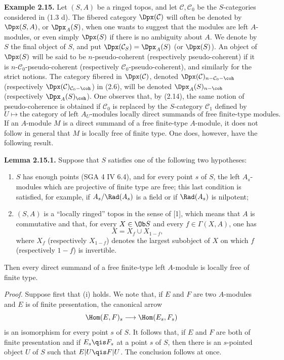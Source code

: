 \documentclass[11pt]{article}
\begin{document}
\textbf{Example 2.15.} Let \((S,A)\) be a ringed topos, and let \(\mathcal C,\mathcal C_0\) be the \(S\)-categories considered in (1.3 d). The fibered category \(\Dpx(\mathcal C)\) will often be denoted by \(\Dpx(S,A)\), or \(\Dpx_A(S)\), when one wants to suggest that the modules are left \(A\)-modules, or even simply \(\Dpx(S)\) if there is no ambiguity about \(A\). We denote by \(S\) the final object of \(S\), and put \(\Dpx(\mathcal C_S)=\Dpx_A(S)\) (or \(\Dpx(S)\)). An object of \(\Dpx(S)\) will be said to be \(n\)-pseudo-coherent (respectively pseudo-coherent) if it is \(n\)-\(\mathcal C_0\)-pseudo-coherent (respectively \(\mathcal C_0\)-pseudo-coherent), and similarly for the strict notions. The category fibered in \(\Dpx(\mathcal C)\), denoted \(\Dpx(\mathcal C)_{n-\mathcal C_0-\coh}\) (respectively \(\Dpx(\mathcal C)_{\mathcal C_0-\coh}\)) in (2.6), will be denoted \(\Dpx_A(S)_{n-\coh}\) (respectively \(\Dpx_A(S)_{\coh}\)). One observes that, by (2.14), the same notion of pseudo-coherence is obtained if \(\mathcal C_0\) is replaced by the \(S\)-category \(\mathcal C_1\) defined by
\[
  U\longmapsto \text{the category of left }A_U\text{-modules locally direct summands of free finite-type modules}.
\]
If an \(A\)-module \(M\) is a direct summand of a free finite-type \(A\)-module, it does not follow in general that \(M\) is locally free of finite type. One does, however, have the following result.

\textbf{Lemma 2.15.1.} Suppose that \(S\) satisfies one of the following two hypotheses:
\begin{enumerate}[label=(\roman*)]
\item \(S\) has enough points (SGA 4 IV 6.4), and for every point \(s\) of \(S\), the left \(A_s\)-modules which are projective of finite type are free; this last condition is satisfied, for example, if \(A_s/\Rad(A_s)\) is a field or if \(\Rad(A_s)\) is nilpotent;
\item \((S,A)\) is a ``locally ringed'' topos in the sense of [1], which means that \(A\) is commutative and that, for every \(X\in\Ob S\) and every \(f\in\Gamma(X,A)\), one has
\[
  X=X_f\cup X_{1-f},
\]
where \(X_f\) (respectively \(X_{1-f}\)) denotes the largest subobject of \(X\) on which \(f\) (respectively \(1-f\)) is invertible.
\end{enumerate}
Then every direct summand of a free finite-type left \(A\)-module is locally free of finite type.

\emph{Proof.} Suppose first that (i) holds. We note that, if \(E\) and \(F\) are two \(A\)-modules and \(E\) is of finite presentation, the canonical arrow
\[
  \Hom(E,F)_s\longrightarrow \Hom(E_s,F_s)
\]
is an isomorphism for every point \(s\) of \(S\). It follows that, if \(E\) and \(F\) are both of finite presentation and if \(E_s\qis F_s\) at a point \(s\) of \(S\), then there is an \(s\)-pointed object \(U\) of \(S\) such that \(E|U\qis F|U\). The conclusion follows at once.
\end{document}
